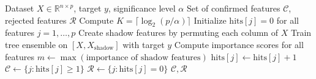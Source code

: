 \documentclass[runningheads]{llncs}
\begin{document}
\begin{algorithm}[t]
\caption{Greedy Boruta Algorithm}
\label{alg:greedy_boruta}
\begin{algorithmic}[1]
\REQUIRE Dataset $X \in \mathbb{R}^{n \times p}$, target $y$, significance level $\alpha$
\ENSURE Set of confirmed features $\mathcal{C}$, rejected features $\mathcal{R}$
\STATE Compute $K = \lceil \log_2(p/\alpha) \rceil$ 
\STATE Initialize $\text{hits}[j] = 0$ for all features $j = 1, \ldots, p$
    \STATE Create shadow features by permuting each column of $X$
    \STATE Train tree ensemble on $[X, X_{\text{shadow}}]$ with target $y$
    \STATE Compute importance scores for all features
    \STATE $m \gets \max(\text{importance of shadow features})$
            \STATE $\text{hits}[j] \gets \text{hits}[j] + 1$
        \ENDIF
    \ENDFOR
\ENDFOR
\STATE $\mathcal{C} \gets \{j : \text{hits}[j] \geq 1\}$ 
\STATE $\mathcal{R} \gets \{j : \text{hits}[j] = 0\}$  
\RETURN $\mathcal{C}, \mathcal{R}$
\end{algorithmic}
\end{algorithm}



 
 
 
\end{document}
